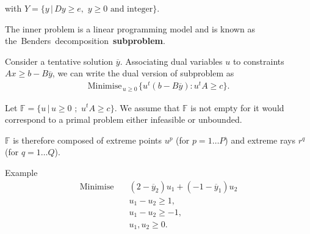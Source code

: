 with $Y = \{ y \, |\, Dy \geq e, \,\, y \geq 0
\textrm{ and integer} \}$.

\vspace{1cm}

The inner problem is a linear programming model and is known as \\ \mbox{the Benders decomposition~\textbf{subproblem}}.


\newpage

Consider a tentative solution $\overline{y}$. Associating dual variables $u$ to constraints $Ax \geq
b-B\overline{y}$, we can write the dual version of  subproblem as
\begin{eqnarray*}
\label{bd3}  \textrm{Minimise}_{\, u\geq 0 \,} \{ u^t(b-B\overline{y}) :
u^tA \geq c\}.
\end{eqnarray*}


Let  $\mathbb{F} = \{ u \, |\, u \geq 0 \,\, ; \, \, u^tA \geq c \}$.  We assume that $\mathbb{F}$ is not empty for it would correspond to a primal problem either infeasible or
unbounded. 

$\mathbb{F}$ is therefore composed of extreme points $u^p$ (for
$p=1 \dots P$) and extreme rays $r^q$ (for $q=1 \dots Q$).\\


\begin{bclogo}[logo=\bccrayon]{\small Example }
\small \vspace{-.5cm}
\begin{align*}
\textrm{Minimise} \quad &  (2-\overline{y}_2)u_1 + (-1 - \overline{y}_1)u_2 \\
& u_1 -  u_2  \geq 1, \\
& u_1 -u_2 \geq -1, \\
& u_1, u_2 \geq 0.
\end{align*}

\end{bclogo}




\begin{center}
\end{center}


